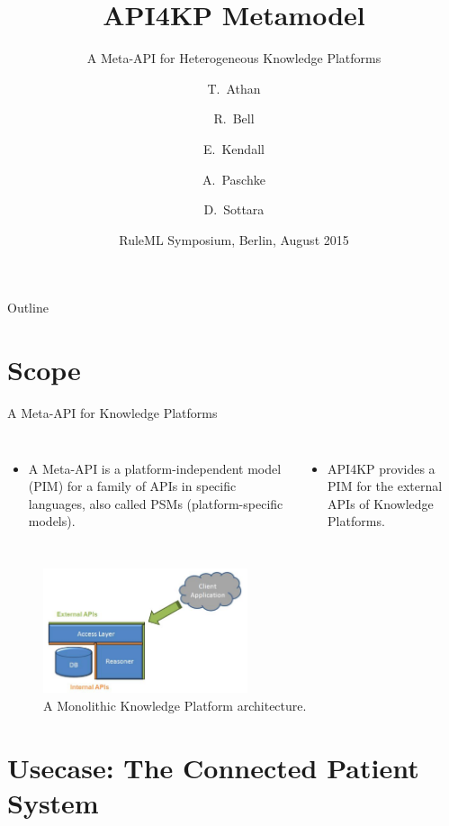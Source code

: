 \documentclass{beamer}
\title{API4KP Metamodel}
\subtitle{A Meta-API for Heterogeneous Knowledge Platforms}
\author{T.~Athan\inst{1} 
\and R.~Bell\inst{2}
\and E.~Kendall\inst{3}
\and A.~Paschke\inst{4}
\and D.~Sottara\inst{5}
}
\institute[Athan Serv/Raytheon/Thematix/FUB/ASU] %
{
 \inst{1}%
 Athan Services (athant.com), West Lafayette, Indiana, USA
\and
 \inst{2}%
 Raytheon, Fort Wayne, Indiana, USA
\and
 \inst{3}%
 Thematix Partners LLC, New York, New York, USA
\and
 \inst{4}%
 AG Corporate Semantic Web, Freie Universitaet Berlin, Germany
\and
 \inst{5}%
 Department of Biomedical Informatics, Arizona State University, USA
}
\date{RuleML Symposium, Berlin, August 2015}
\begin{document}
\begin{frame}
  \titlepage
\end{frame}

\begin{frame}{Outline}
  \tableofcontents
\end{frame}

\section{Scope}
\begin{frame}{A Meta-API for Knowledge Platforms}

\begin{columns}[c]
\column{2.2in}
\begin{itemize}
\item A Meta-API is a platform-independent model (PIM) for a family of APIs in specific languages, also called PSMs (platform-specific models).
\end{itemize}
\column{1.5in}
\begin{itemize}
\item API4KP provides a PIM for the external APIs of Knowledge Platforms.
\end{itemize}
\end{columns}
\begin{figure}[ht!]
\centering
\includegraphics[width=60mm]{diagrams/SimpleKnowledgePlatformArchitecture.png}
\caption{A Monolithic Knowledge Platform architecture.}
\end{figure}  

\end{frame}


\section{Usecase: The Connected Patient System}
\end{document}
